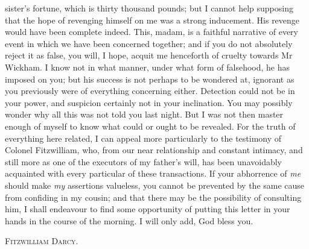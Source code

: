 sister's fortune, which is thirty thousand pounds; but I cannot help supposing that the hope of revenging himself on me was a strong inducement. His revenge would have been complete indeed. This, madam, is a faithful narrative of every event in which we have been concerned together; and if you do not absolutely reject it as false, you will, I hope, acquit me henceforth of cruelty towards Mr Wickham. I know not in what manner, under what form of falsehood, he has imposed on you; but his success is not perhaps to be wondered at, ignorant as you previously were of everything concerning either. Detection could not be in your power, and suspicion certainly not in your inclination. You may possibly wonder why all this was not told you last night. But I was not then master enough of myself to know what could or ought to be revealed. For the truth of everything here related, I can appeal more particularly to the testimony of Colonel Fitzwilliam, who, from our near relationship and constant intimacy, and still more as one of the executors of my father's will, has been unavoidably acquainted with every particular of these transactions. If your abhorrence of \textit{me} should make \textit{my} assertions valueless, you cannot be prevented by the same cause from confiding in my cousin; and that there may be the possibility of consulting him, I shall endeavour to find some opportunity of putting this letter in your hands in the course of the morning. I will only add, God bless you.

\begin{flushright}
\textsc{Fitzwilliam Darcy.}
\end{flushright}

